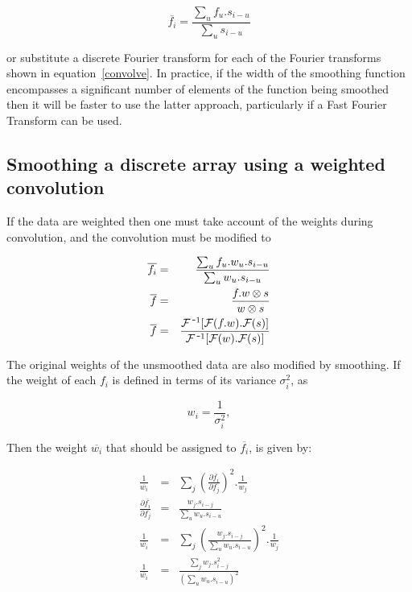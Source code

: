 \documentclass[12pt]{article}
\begin{document}
\begin{equation}
 \overline{f_{i}} = \frac{\sum_{u} f_{u}.s_{i-u}}
	                 {\sum_{u} s_{i-u}}
\end{equation}

or substitute a discrete Fourier transform for each of the Fourier
transforms shown in equation~\ref{convolve}. In practice, if the
width of the smoothing function encompasses a significant number of
elements of the function being smoothed then it will be faster to use the
latter approach, particularly if a Fast Fourier Transform can be used.

\subsection{Smoothing a discrete array using a weighted convolution}

If the data are weighted then one must take account of the weights
during convolution, and the convolution must be modified to

\begin{eqnarray}
 \overline{f_{i}} &=& \frac{\sum_{u} f_{u}.w_{u}.s_{i-u}} {\sum_{u} w_{u}.s_{i-u}}\\
     \overline{f} &=& \frac {f.w \otimes s} {w \otimes s}\\
     \overline{f} &=& \frac {{\cal F}^{\mbox{\,-}1}[{\cal F}(f.w).{\cal F}(s)]} {{\cal F}^{\mbox{\,-}1}[{\cal F}(w).{\cal F}(s)]}
\end{eqnarray}

The original weights of the unsmoothed data are also modified by smoothing.
If the weight of each $f_i$ is defined in terms of its variance
$\sigma_i^2$, as

\begin{equation}
  w_{i}  = \frac{1}{\sigma_{i}^2},
\end{equation}

Then the weight $\overline{w_{i}}$ that should be assigned to
$\overline{f_{i}}$, is given by:

\begin{eqnarray}
 \frac{1}{\overline{w_{i}}} &=& \sum_{j}\left(\frac{\partial\overline{f_{i}}}{\partial f_{j}}\right)^{2} . \frac{1}{w_{j}} \\
%
 \frac{\partial \overline{f_{i}}}{\partial f_{j}} &=& \frac {w_{j}.s_{i-j}}{\sum_{u} w_{u} . s_{i-u}} \\
%
 \frac{1}{\overline{w_{i}}} &=& \sum_{j}\left(\frac {w_{j}.s_{i-j}}{\sum_{u} w_{u} . s_{i-u}}\right)^{2} . \frac{1}{w_{j}} \\
%
 \label{variance}
 \frac{1}{\overline{w_{i}}} &=& \frac {\sum_{j} w_{j}.s_{i-j}^2}{(\sum_{u} w_{u} . s_{i-u})^{2}}
\end{eqnarray}
\end{document}
